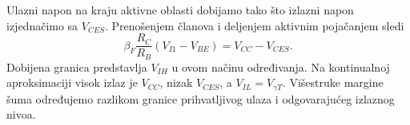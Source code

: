 Ulazni napon na kraju aktivne oblasti dobijamo tako što izlazni napon izjednačimo sa $V_{CES}$. Prenošenjem članova i deljenjem aktivnim pojačanjem sledi
\[\beta_F\frac{R_C}{R_B}(V_{I1}-V_{BE})=V_{CC}-V_{CES}.\]
Dobijena granica predstavlja $V_{IH}$ u ovom načinu određivanja. Na kontinualnoj aproksimaciji visok izlaz je $V_{CC}$, nizak $V_{CES}$, a $V_{IL}=V_{\gamma T}$. Višestruke margine šuma određujemo razlikom granice prihvatljivog ulaza i odgovarajućeg izlaznog nivoa.

